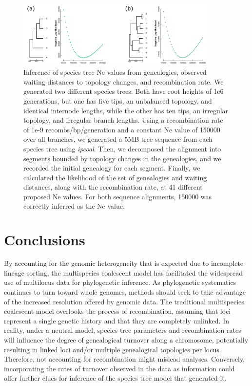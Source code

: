 \documentclass[11pt]{article}
\begin{document}
\begin{figure}
	\centering
	\includegraphics[width=0.9\textwidth]{figures/Fig6-constant_ne_inf.pdf}
	\caption{Inference of species tree Ne values from genealogies, observed waiting distances to topology changes, and recombination rate. We generated two different species trees: Both have root heights of 1e6 generations, but one has five tips, an unbalanced topology, and identical internode lengths, while the other has ten tips, an irregular topology, and irregular branch lengths. Using a recombination rate of 1e-9 recombs/bp/generation and a constant Ne value of 150000 over all branches, we generated a 5MB tree sequence from each species tree using \emph{ipcoal}. Then, we decomposed the alignment into segments bounded by topology changes in the genealogies, and we recorded the initial genealogy for each segment. Finally, we calculated the likelihood of the set of genealogies and waiting distances, along with the recombination rate, at 41 different proposed Ne values. For both sequence alignments, 150000 was correctly inferred as the Ne value.}
\end{figure}

\section{Conclusions}

By accounting for the genomic heterogeneity that is expected due to incomplete lineage sorting, the multispecies coalescent model has facilitated the widespread use of multilocus data for phylogenetic inference. As phylogenetic systematics continues to turn toward whole genomes, methods should seek to take advantage of the increased resolution offered by genomic data. The traditional multispecies coalescent model overlooks the process of recombination, assuming that loci represent a single genetic history and that they are completely unlinked. In reality, under a neutral model, species tree parameters and recombination rates will influence the degree of genealogical turnover along a chromosome, potentially resulting in linked loci and/or multiple genealogical topologies per locus. Therefore, not accounting for recombination might mislead analyses. Conversely, incorporating the rates of turnover observed in the data as information could offer further clues for inference of the species tree model that generated it. 
\end{document}
